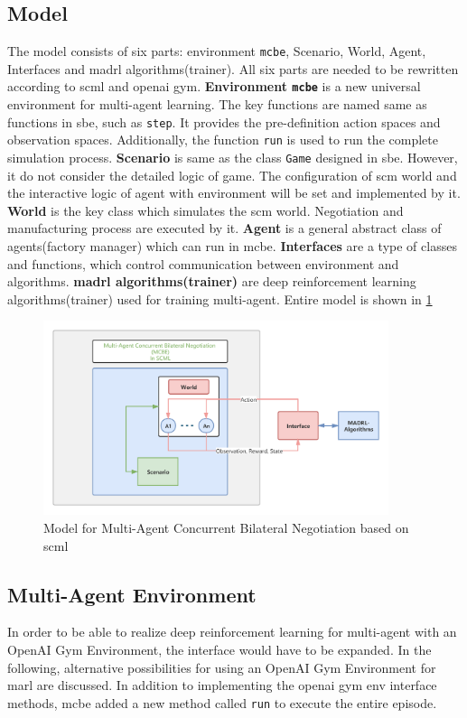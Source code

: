\subsection{Model}
The model consists of six parts: environment \texttt{\gls{mcbe}}, Scenario, World, Agent, Interfaces and \gls{madrl} algorithms(trainer).
All six parts are needed to be rewritten according to \gls{scml} and \gls{openai gym}. 
\textbf{Environment \texttt{\gls{mcbe}}} is a new universal environment for multi-agent learning. The key functions are named same as functions in \gls{sbe}, such as \texttt{step}. It provides the pre-definition action spaces and observation spaces.  Additionally, the function \texttt{run} is used to run the complete simulation process. 
\textbf{Scenario} is same as the class \texttt{Game} designed in \gls{sbe}. However, it do not consider the detailed logic of game. The configuration of \gls{scm} world and the interactive logic of agent with environment will be set and implemented by it.
\textbf{World} is the key class which simulates the \gls{scm} world. Negotiation and manufacturing process are executed by it.
\textbf{Agent} is a general abstract class of agents(factory manager) which can run in \gls{mcbe}. 
\textbf{Interfaces} are a type of classes and functions, which control communication between environment and algorithms.
\textbf{\gls{madrl} algorithms(trainer)} are deep reinforcement learning algorithms(trainer) used for training multi-agent.
Entire model is shown in \ref{fig:environment-multi-agent}

\begin{figure}[htbp]
\centering
\includegraphics[width=0.9\textwidth]{./images/MCBE.png}
\caption{Model for Multi-Agent Concurrent Bilateral Negotiation based on \gls{scml}}
\label{fig:environment-multi-agent}
\end{figure}

\subsection{Multi-Agent Environment} \label{multi-agent-env}
In order to be able to realize deep reinforcement learning for multi-agent with an OpenAI Gym Environment, the interface would have to be expanded. In the following, alternative possibilities for using an OpenAI Gym Environment for \gls{marl} are discussed. 
In addition to implementing the \gls{openai gym} env interface methods, \gls{mcbe} added a new method called \texttt{run} to execute the entire episode.

